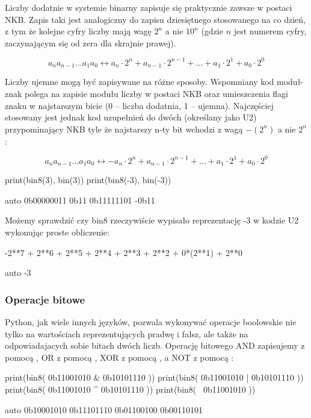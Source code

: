 Liczby dodatnie w systemie binarny zapisuje się praktycznie zawsze w postaci NKB. Zapis taki jest analogiczny do zapisu dziesiętnego stosowanego na co dzień, z tym że kolejne cyfry liczby mają wagę $2^n$ a nie $10^n$ (gdzie $n$ jest numerem cyfry, zaczynającym się od zera dla skrajnie prawej).

$$ a_{n}a_{n-1}...a_{1}a_{0} \leftrightarrow a_{n} \cdot 2^{n} + a_{n-1} \cdot 2^{n-1} + ... + a_{1} \cdot 2^{1} + a_{0} \cdot 2^{0} $$

Liczby ujemne mogą być zapisywane na różne sposoby.
Wspomniany kod moduł-znak polega na zapisie modułu liczby w postaci NKB oraz umieszczenia flagi znaku w najstarszym bicie (0 – liczba dodatnia, 1 – ujemna).
Najczęściej stosowany jest jednak kod uzupełnień do dwóch (określany jako U2) przypominający NKB tyle że najstarszy n-ty bit wchodzi z wagą $-(2^n)$ a nie $2^n$:

$$ a_{n}a_{n-1}...a_{1}a_{0} \leftrightarrow - a_{n} \cdot 2^{n} + a_{n-1} \cdot 2^{n-1} + ... + a_{1} \cdot 2^{1} + a_{0} \cdot 2^{0} $$

\begin{CodeFrame}[python]{0.55\textwidth}
print(bin8(3),  bin(3))
print(bin8(-3), bin(-3))
\end{CodeFrame}
\begin{CodeFrame}{auto}
0b00000011 0b11
0b11111101 -0b11
\end{CodeFrame}

Możemy sprawdzić czy bin8 rzeczywiście wypisało reprezentację -3 w kodzie U2 wykonując proste obliczenie:

\begin{CodeFrame}[python]{0.75\textwidth}
-2**7 + 2**6 + 2**5 + 2**4 + 2**3 + 2**2 + 0*(2**1) + 2**0
\end{CodeFrame}
\begin{CodeFrame}{auto}
-3
\end{CodeFrame}

\subsubsection{Operacje bitowe}

Python, jak wiele innych języków, pozwala wykonywać operacje boolowskie nie tylko na wartościach reprezentujących pradwę i fałsz, ale także na odpowiadajacych sobie bitach dwóch liczb.
Operację bitowego AND zapisujemy z pomocą \python{&}, OR z pomocą \python{|}, XOR z pomocą \python{^}, a NOT  z pomocą \python{~}:

\begin{CodeFrame}[python]{0.55\textwidth}
print(bin8( 0b11001010 & 0b10101110 ))
print(bin8( 0b11001010 | 0b10101110 ))
print(bin8( 0b11001010 ^ 0b10101110 ))
print(bin8( ~0b11001010 ))
\end{CodeFrame}
\begin{CodeFrame}{auto}
0b10001010
0b11101110
0b01100100
0b00110101
\end{CodeFrame}

